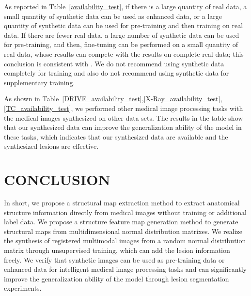 \documentclass[runningheads]{llncs}
\begin{document}
As reported in Table~\ref{availability_test}, if there is a large quantity of real data, a small quantity of synthetic data can be used as enhanced data, or a large quantity of synthetic data can be used for pre-training and then training on real data. If there are fewer real data, a large number of synthetic data can be used for pre-training, and then, fine-tuning can be performed on a small quantity of real data, whose results can compete with the results on complete real data; this conclusion is consistent with \cite{4shin2018medical}. We do not recommend using synthetic data completely for training and also do not recommend using synthetic data for supplementary training.

As shown in Table~\ref{DRIVE_availability_test},\ref{X-Ray_availability_test},\ref{TC_availability_test}, we performed other medical image processing tasks with the medical images synthesized on other data sets. The results in the table show that our synthesized data can improve the generalization ability of the model in these tasks, which indicates that our synthesized data are available and the synthesized lesions are effective.

\section{CONCLUSION}
In short, we propose a structural map extraction method to extract anatomical structure information directly from medical images without training or additional label data.
We propose a structure feature map generation method to generate structural maps from multidimensional normal distribution matrixes.
We realize the synthesis of registered multimodal images from a random normal distribution matrix through unsupervised training, which can add the lesion information freely.
We verify that synthetic images can be used as pre-training data or enhanced data for intelligent medical image processing tasks and can significantly improve the generalization ability of the model through lesion segmentation experiments.

%
%
%


\end{document}
